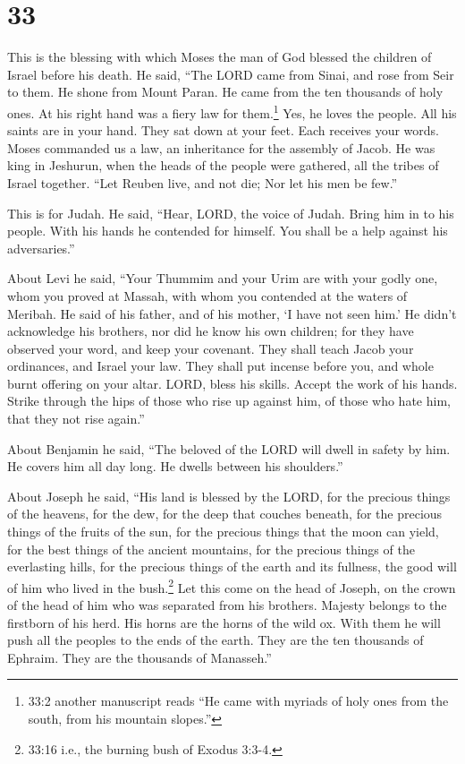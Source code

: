 \hypertarget{section-32}{%
\section{33}\label{section-32}}

 This is the blessing with which Moses the man of God
blessed the children of Israel before his death.  He said,
``The LORD came from Sinai, and rose from Seir to them. He shone from
Mount Paran. He came from the ten thousands of holy ones. At his right
hand was a fiery law for them.\footnote{33:2 another manuscript reads
  ``He came with myriads of holy ones from the south, from his mountain
  slopes.''}  Yes, he loves the people. All his saints are
in your hand. They sat down at your feet. Each receives your words.
 Moses commanded us a law, an inheritance for the assembly
of Jacob.  He was king in Jeshurun, when the heads of the
people were gathered, all the tribes of Israel together. 
``Let Reuben live, and not die; Nor let his men be few.''

 This is for Judah. He said, ``Hear, LORD, the voice of
Judah. Bring him in to his people. With his hands he contended for
himself. You shall be a help against his adversaries.''

 About Levi he said, ``Your Thummim and your Urim are with
your godly one, whom you proved at Massah, with whom you contended at
the waters of Meribah.  He said of his father, and of his
mother, `I have not seen him.' He didn't acknowledge his brothers, nor
did he know his own children; for they have observed your word, and keep
your covenant.  They shall teach Jacob your ordinances, and
Israel your law. They shall put incense before you, and whole burnt
offering on your altar.  LORD, bless his skills. Accept the
work of his hands. Strike through the hips of those who rise up against
him, of those who hate him, that they not rise again.''

 About Benjamin he said, ``The beloved of the LORD will
dwell in safety by him. He covers him all day long. He dwells between
his shoulders.''

 About Joseph he said, ``His land is blessed by the LORD,
for the precious things of the heavens, for the dew, for the deep that
couches beneath,  for the precious things of the fruits of
the sun, for the precious things that the moon can yield, 
for the best things of the ancient mountains, for the precious things of
the everlasting hills,  for the precious things of the
earth and its fullness, the good will of him who lived in the
bush.\footnote{33:16 i.e., the burning bush of Exodus 3:3-4.} Let this
come on the head of Joseph, on the crown of the head of him who was
separated from his brothers.  Majesty belongs to the
firstborn of his herd. His horns are the horns of the wild ox. With them
he will push all the peoples to the ends of the earth. They are the ten
thousands of Ephraim. They are the thousands of Manasseh.''

